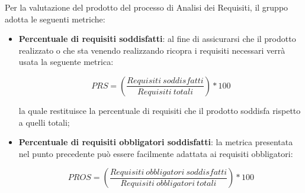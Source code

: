 Per la valutazione del prodotto del processo di Analisi dei Requisiti, il gruppo adotta le seguenti metriche:
\begin{itemize}
	\item \textbf{Percentuale di requisiti soddisfatti}: al fine di assicurarsi che il prodotto realizzato o che sta venendo realizzando ricopra i requisiti necessari verrà usata la seguente metrica:
\begin{center}
\[PRS = \left(\frac{Requisiti\ soddisfatti}{Requisiti\ totali}\right)*100\]
\end{center}
la quale restituisce la percentuale di requisiti che il prodotto soddisfa rispetto a quelli totali;

	\item \textbf{Percentuale di requisiti obbligatori soddisfatti}: la metrica presentata nel punto precedente può essere facilmente adattata ai requisiti obbligatori:
\begin{center}
\[PROS=\left(\frac{Requisiti\ obbligatori\ soddisfatti}{Requisiti\ obbligatori\ totali}\right)*100\]
\end{center}
\end{itemize}


